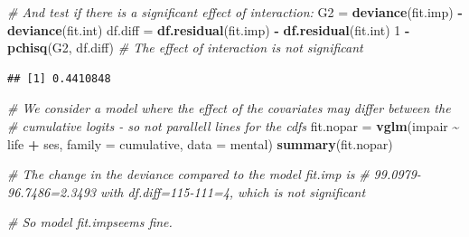 \documentclass[
  ignorenonframetext,
]{beamer}
\newenvironment{Shaded}{\begin{snugshade}}{\end{snugshade}}
\newcommand{\AttributeTok}[1]{\textcolor[rgb]{0.13,0.29,0.53}{#1}}
\newcommand{\CommentTok}[1]{\textcolor[rgb]{0.56,0.35,0.01}{\textit{#1}}}
\newcommand{\DecValTok}[1]{\textcolor[rgb]{0.00,0.00,0.81}{#1}}
\newcommand{\FunctionTok}[1]{\textcolor[rgb]{0.13,0.29,0.53}{\textbf{#1}}}
\newcommand{\NormalTok}[1]{#1}
\newcommand{\OtherTok}[1]{\textcolor[rgb]{0.56,0.35,0.01}{#1}}
\newcommand{\SpecialCharTok}[1]{\textcolor[rgb]{0.81,0.36,0.00}{\textbf{#1}}}
\begin{document}
\begin{frame}[fragile]
\begin{Shaded}
\begin{Highlighting}[]
\CommentTok{\# And test if there is a significant effect of interaction:}
\NormalTok{G2 }\OtherTok{=} \FunctionTok{deviance}\NormalTok{(fit.imp) }\SpecialCharTok{{-}} \FunctionTok{deviance}\NormalTok{(fit.int)}
\NormalTok{df.diff }\OtherTok{=} \FunctionTok{df.residual}\NormalTok{(fit.imp) }\SpecialCharTok{{-}} \FunctionTok{df.residual}\NormalTok{(fit.int)}
\DecValTok{1} \SpecialCharTok{{-}} \FunctionTok{pchisq}\NormalTok{(G2, df.diff)}
\CommentTok{\# The effect of interaction is not significant}
\end{Highlighting}
\end{Shaded}

\begin{verbatim}
## [1] 0.4410848
\end{verbatim}

\begin{Shaded}
\begin{Highlighting}[]
\CommentTok{\# We consider a model where the effect of the covariates may differ between the}
\CommentTok{\# cumulative logits {-} so not parallell lines for the cdfs}
\NormalTok{fit.nopar }\OtherTok{=} \FunctionTok{vglm}\NormalTok{(impair }\SpecialCharTok{\textasciitilde{}}\NormalTok{ life }\SpecialCharTok{+}\NormalTok{ ses, }\AttributeTok{family =}\NormalTok{ cumulative, }\AttributeTok{data =}\NormalTok{ mental)}
\FunctionTok{summary}\NormalTok{(fit.nopar)}

\CommentTok{\# The change in the deviance compared to the model \textquotesingle{}fit.imp\textquotesingle{} is}
\CommentTok{\# 99.0979{-}96.7486=2.3493 with df.diff=115{-}111=4, which is not significant}

\CommentTok{\# So model \textquotesingle{}fit.imp\textquotesingle{}seems fine.}
\end{Highlighting}
\end{Shaded}


\end{frame}
\end{document}
